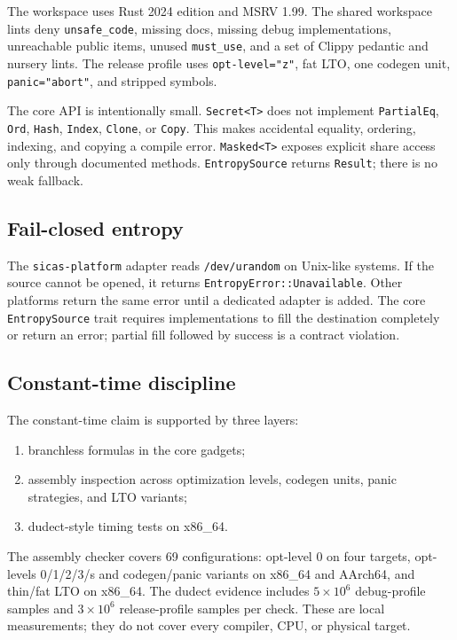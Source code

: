 \documentclass[11pt,a4paper]{article}
\newcommand{\code}[1]{\texttt{#1}}
\theoremstyle{plain}
\theoremstyle{definition}
\theoremstyle{remark}
\begin{document}
The workspace uses Rust 2024 edition and MSRV 1.99. The shared workspace lints deny
\code{unsafe\_code}, missing docs, missing debug implementations, unreachable public
items, unused \code{must\_use}, and a set of Clippy pedantic and nursery lints. The
release profile uses \code{opt-level="z"}, fat LTO, one codegen unit,
\code{panic="abort"}, and stripped symbols.

The core API is intentionally small. \code{Secret<T>} does not implement
\code{PartialEq}, \code{Ord}, \code{Hash}, \code{Index}, \code{Clone}, or \code{Copy}.
This makes accidental equality, ordering, indexing, and copying a compile error.
\code{Masked<T>} exposes explicit share access only through documented methods.
\code{EntropySource} returns \code{Result}; there is no weak fallback.

\subsection{Fail-closed entropy}

The \code{sicas-platform} adapter reads \code{/dev/urandom} on Unix-like systems. If
the source cannot be opened, it returns \code{EntropyError::Unavailable}. Other
platforms return the same error until a dedicated adapter is added. The core
\code{EntropySource} trait requires implementations to fill the destination completely
or return an error; partial fill followed by success is a contract violation.

\subsection{Constant-time discipline}

The constant-time claim is supported by three layers:

\begin{enumerate}[leftmargin=1.5em]
  \item branchless formulas in the core gadgets;
  \item assembly inspection across optimization levels, codegen units, panic
        strategies, and LTO variants;
  \item dudect-style timing tests on x86\_64.
\end{enumerate}

The assembly checker covers 69 configurations: opt-level 0 on four targets,
opt-levels 0/1/2/3/s and codegen/panic variants on x86\_64 and AArch64, and thin/fat
LTO on x86\_64. The dudect evidence includes \(5\times10^6\) debug-profile samples and
\(3\times10^6\) release-profile samples per check. These are local measurements; they
do not cover every compiler, CPU, or physical target.
\end{document}
